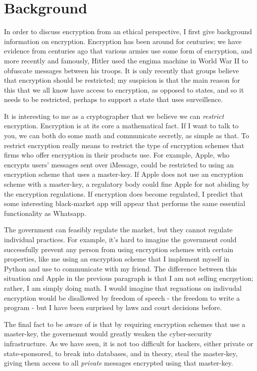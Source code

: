 \documentclass[11pt]{article}
\begin{document}
\section{Background}
In order to discuss encryption from an ethical perspective, I first give background information on encryption.
Encryption has been around for centuries; we have evidence from centuries ago that various armies use some form of encryption, and more recently and famously, Hitler used the engima machine in World War II to obfuscate messages between his troops.
It is only recently that groups believe that encryption should be restricted; my suspicion is that the main reason for this that we all know have access to encryption, as opposed to states, and so it needs to be restricted, perhaps to support a state that uses surveillence.

It is interesting to me as a cryptographer that we believe we can \textit{restrict} encryption.
Encryption is at its core a mathematical fact.
If I want to talk to you, we can both do some math and communicate secretly, as simple as that.
To restrict encryption really means to restrict the type of encryption schemes that firms who offer encryption in their products use.
For example, Apple, who encrypts users' messages sent over iMessage, could be restricted to using an encryption scheme that uses a master-key.
If Apple does not use an encryption scheme with a master-key, a regulatory body could fine Apple for not abiding by the encryption regulations.
If encryption does become regulated, I predict that some interesting black-market app will appear that performs the same essential functionality as Whatsapp.

The government can feasibly regulate the market, but they cannot regulate individual practices.
For example, it's hard to imagine the government could successfully prevent any person from using encryption schemes with certain properties, like me using an encryption scheme that I implement myself in Python and use to communicate with my friend.
The difference between this situation and Apple in the previous paragraph is that I am not selling encrpytion; rather, I am simply doing math.
I would imagine that reguations on indivudal encryption would be disallowed by freedom of speech - the freedom to write a program - but I have been surprised by laws and court decisions before.

The final fact to be aware of is that by requiring encryption schemes that use a master-key, the governemnt would greatly weaken the cyber-security infrastructure.
As we have seen, it is not too difficult for hackers, either private or state-sponsored, to break into databases, and in theory, steal the master-key, giving them access to all \textit{private} messages encrypted using that master-key.
\end{document}
